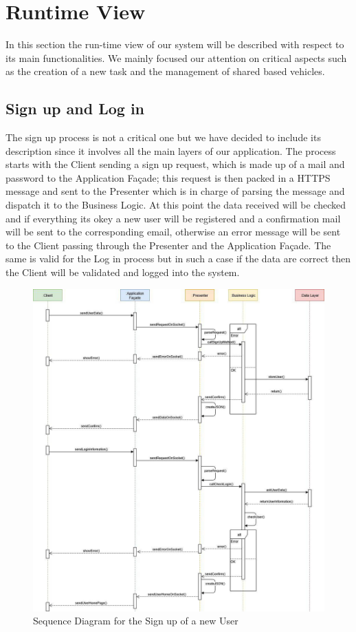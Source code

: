 \section{Runtime View}
In this section the run-time view of our system will be described with respect to its main functionalities. We mainly focused our attention on critical aspects such as the creation of a new task and the management of shared based vehicles.

\subsection{Sign up and Log in}
The sign up process is not a critical one but we have decided to include its description since it involves all the main layers of our application. 
The process starts with the Client sending a sign up request, which is made up of a mail and password to the Application Façade; this request is then packed in a HTTPS message and sent to the Presenter which is in charge of parsing the message and dispatch it to the Business Logic. At this point the data received will be checked and if everything its okey a new user will be registered and a confirmation mail will be sent to the corresponding email, otherwise an error message will be sent to the Client passing through the Presenter and the Application Façade.
The same is valid for the Log in process but in such a case if the data are correct then the Client will be validated and logged into the system.

\begin{figure}[H]
    \centering
    \includegraphics[scale=0.55]{Pictures/RunTimeView/signIn.jpg}
    \caption{Sequence Diagram for the Sign up of a new User}
    \label{fig:sequenceSignUp}
\end{figure}

